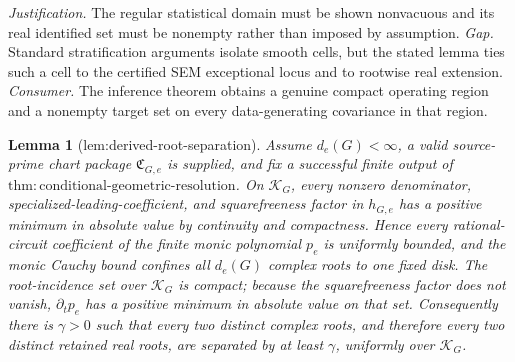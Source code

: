 \documentclass{article}
\newtheorem{lemma}{Lemma}
\begin{document}
\par\smallskip\noindent \textit{Justification.} The regular statistical domain must be shown nonvacuous and its real identified set must be nonempty rather than imposed by assumption. \textit{Gap.} Standard stratification arguments isolate smooth cells, but the stated lemma ties such a cell to the certified SEM exceptional locus and to rootwise real extension. \textit{Consumer.} The inference theorem obtains a genuine compact operating region and a nonempty target set on every data-generating covariance in that region.

\begin{lemma}[lem:derived-root-separation]\label{lem:derived-root-separation}
Assume \(d_e(G)<\infty\), a valid source-prime chart package \(\mathfrak C_{G,e}\) is supplied, and fix a successful finite output of \(\mathrm{thm:conditional\mbox{-}geometric\mbox{-}resolution}\). On \(\mathcal K_G\), every nonzero denominator, specialized-leading-coefficient, and squarefreeness factor in \(h_{G,e}\) has a positive minimum in absolute value by continuity and compactness. Hence every rational-circuit coefficient of the finite monic polynomial \(p_e\) is uniformly bounded, and the monic Cauchy bound confines all \(d_e(G)\) complex roots to one fixed disk. The root-incidence set over \(\mathcal K_G\) is compact; because the squarefreeness factor does not vanish, \(\partial_t p_e\) has a positive minimum in absolute value on that set. Consequently there is \(\gamma>0\) such that every two distinct complex roots, and therefore every two distinct retained real roots, are separated by at least \(\gamma\), uniformly over \(\mathcal K_G\).
\end{lemma}
\end{document}
